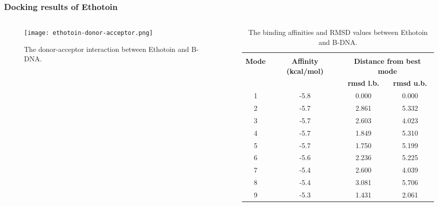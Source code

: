 \frametitle{Docking results of Ethotoin}
\begin{columns}
	\begin{column}{0.6\linewidth}
		\begin{figure}
			\texttt{[image: ethotoin-donor-acceptor.png]}
			\caption{\centering The donor-acceptor interaction \linebreak between Ethotoin and B-DNA.}
			\label{fig:eth_donor_acceptor}
		\end{figure}
	\end{column}
	\begin{column}{0.45\linewidth}
		\centering
		\scriptsize
		\begin{table}
			\begin{tabular}{*{4}{c}}
				\hline\\[-1em]
				\multirow{2}{2em}{\centering\textbf{Mode}}&\multirow{2}{4em}{\centering\textbf{Affinity (kcal/mol)}}&\multicolumn{2}{c}{\centering\textbf{Distance from best mode}}\\
				\cline{3-4}
				&&\textbf{rmsd l.b.}&\textbf{rmsd u.b.}\\
				1&-5.8&0.000&0.000\\
				2&-5.7&2.861&5.332\\
				3&-5.7&2.603&4.023\\
				4&-5.7&1.849&5.310\\
				5&-5.7&1.750&5.199\\
				6&-5.6&2.236&5.225\\
				7&-5.4&2.600&4.039\\
				8&-5.4&3.081&5.706\\
				9&-5.3&1.431&2.061\\
				\hline
			\end{tabular}
			\caption{\centering The binding affinities and RMSD values \linebreak between Ethotoin and B-DNA.}
			\label{table:eth}
		\end{table}
	\end{column}
\end{columns}